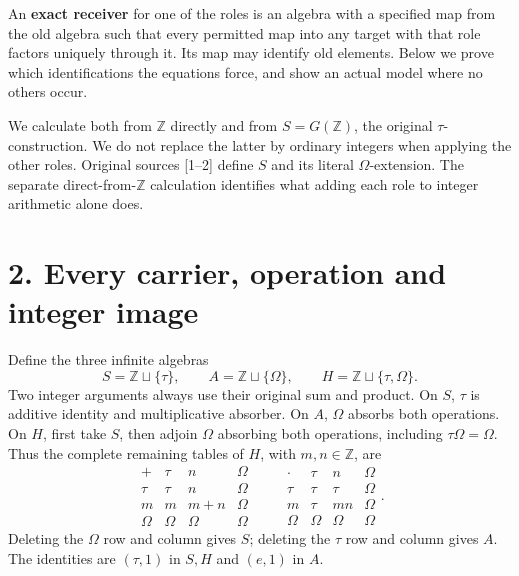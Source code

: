 \documentclass[
]{article}
\begin{document}
An \textbf{exact receiver} for one of the roles is an algebra with a
specified map from the old algebra such that every permitted map into
any target with that role factors uniquely through it. Its map may
identify old elements. Below we prove which identifications the
equations force, and show an actual model where no others occur.

We calculate both from \(\mathbb Z\) directly and from
\(S=G(\mathbb Z)\), the original \(\tau\)-construction. We do not
replace the latter by ordinary integers when applying the other roles.
Original sources {[}1--2{]} define \(S\) and its literal
\(\Omega\)-extension. The separate direct-from-\(\mathbb Z\) calculation
identifies what adding each role to integer arithmetic alone does.

\section{2. Every carrier, operation and integer
image}\label{every-carrier-operation-and-integer-image}

Define the three infinite algebras \[
S=\mathbb Z\sqcup\{\tau\},\qquad
A=\mathbb Z\sqcup\{\Omega\},\qquad
H=\mathbb Z\sqcup\{\tau,\Omega\}.
\tag{Z1}
\] Two integer arguments always use their original sum and product. On
\(S\), \(\tau\) is additive identity and multiplicative absorber. On
\(A\), \(\Omega\) absorbs both operations. On \(H\), first take \(S\),
then adjoin \(\Omega\) absorbing both operations, including
\(\tau\Omega=\Omega\). Thus the complete remaining tables of \(H\), with
\(m,n\in\mathbb Z\), are \[
\begin{array}{c|ccc}
+&\tau&n&\Omega\\\hline
\tau&\tau&n&\Omega\\
m&m&m+n&\Omega\\
\Omega&\Omega&\Omega&\Omega
\end{array}
\qquad
\begin{array}{c|ccc}
\cdot&\tau&n&\Omega\\\hline
\tau&\tau&\tau&\Omega\\
m&\tau&mn&\Omega\\
\Omega&\Omega&\Omega&\Omega
\end{array}.
\tag{Z2}
\] Deleting the \(\Omega\) row and column gives \(S\); deleting the
\(\tau\) row and column gives \(A\). The identities are \((\tau,1)\) in
\(S,H\) and \((e,1)\) in \(A\).
\end{document}
